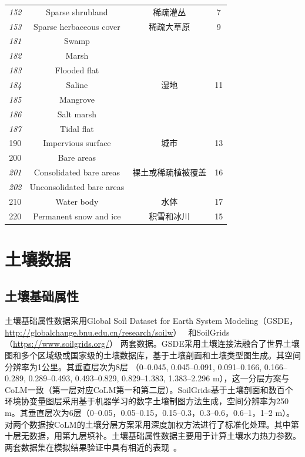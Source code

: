 \begin{table}[htbp]
\begin{tabular}{cccc}
%
\cline{1-4} \textit{152} & Sparse shrubland & 稀疏灌丛 & 7 \\
%
\cline{1-4} \textit{153} & Sparse herbaceous cover & 稀疏大草原 & 9 \\
%
\cline{1-4} \textit{181} & Swamp & \multirow{7}{*}{湿地} & \multirow{7}{*}{11} \\
 \textit{182} & Marsh & & \\
 \textit{183} & Flooded flat & & \\
 \textit{184} & Saline & & \\
 \textit{185} & Mangrove & & \\
 \textit{186} & Salt marsh & & \\
 \textit{187} & Tidal flat & & \\
%
\cline{1-4} 190 & Impervious surface & 城市 & 13 \\
%
\cline{1-4} 200 & Bare areas & \multirow{3}{*}{裸土或稀疏植被覆盖} & \multirow{3}{*}{16} \\
 \textit{201} & Consolidated bare areas & & \\
 \textit{202} & Unconsolidated bare areas & & \\
%
\cline{1-4} 210 & Water body & 水体 & 17 \\
%
\cline{1-4} 220 & Permanent snow and ice & 积雪和冰川 & 15 \\
%
\bottomrule
\end{tabular}
\end{table}

\section{土壤数据}\label{土壤数据}
\subsection{土壤基础属性}\label{土壤基础属性}
土壤基础属性数据采用Global Soil Dataset for Earth System Modeling（GSDE，\url{http://globalchange.bnu.edu.cn/research/soilw}）~\citep{shangguan2014global}
和SoilGrids（\url{https://www.soilgrids.org/}）\citep{poggio2021soilgrids} 两套数据。GSDE采用土壤连接法融合了世界土壤图和多个区域级或国家级的土壤数据库，基于土壤剖面和土壤类型图生成。其空间分辨率为1公里。其垂直层次为8层 （0--0.045, 0.045--0.091, 0.091--0.166, 0.166--0.289, 0.289--0.493, 0.493--0.829, 0.829--1.383, 1.383--2.296 m），这一分层方案与CoLM一致（第一层对应CoLM第一和第二层）。SoilGrids基于土壤剖面和数百个环境协变量图层采用基于机器学习的数字土壤制图方法生成，空间分辨率为250 m。其垂直层次为6层（0--0.05，0.05--0.15，0.15--0.3，0.3--0.6，0.6--1，1--2 m）。对两个数据按CoLM的土壤分层方案采用深度加权方法进行了标准化处理。其中第十层无数据，用第九层填补。土壤基础属性数据主要用于计算土壤水力热力参数。两套数据集在模拟结果验证中具有相近的表现~\citep{李文耀2020土壤}。

